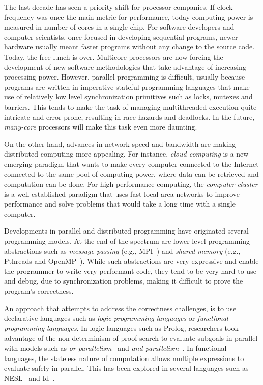 \documentclass[preprint]{sigplanconf}
\begin{document}
The last decade has seen a priority shift for processor companies. If clock frequency
was once the main metric for performance, today computing power is measured in number of
cores in a single chip.
For software developers and computer scientists, once focused in developing sequential programs,
newer hardware usually meant faster programs without any change to the source code. Today,
the free lunch is over. Multicore processors are now forcing the development of
new software methodologies that take advantage of increasing processing power.
However, parallel programming is difficult, usually because programs are written
in imperative stateful programming languages that make use of relatively low level synchronization
primitives such as locks, mutexes and barriers. This tends to make the task of managing multithreaded
execution quite intricate and error-prone, resulting in race hazards and deadlocks.
In the future, \emph{many-core} processors will make this task even more daunting.

On the other hand, advances in network speed and bandwidth are making distributed computing
more appealing. For instance, \emph{cloud computing} is a new emerging paradigm that wants
to make every computer connected to the Internet connected to the same pool of computing power,
where data can be retrieved and computation can be done. For high performance computing, the
\emph{computer cluster} is a well established paradigm that uses fast local area networks to
improve performance and solve problems that would take a long time with a single computer.

Developments in parallel and distributed programming have originated several programming models.
At the end of the spectrum are lower-level programming abstractions such as
\emph{message passing} (e.g., MPI~\cite{gabriel04-open-mpi}) and \emph{shared memory}
(e.g., Pthreads and OpenMP~\cite{Chapman-2007-UOP-1370966}).
While such abstractions are very expressive and enable the programmer to write very performant code,
they tend to be very hard to use and debug, due to synchronization problems, making it difficult to
prove the program's correctness.

An approach that attempts to address the correctness challenges, is to use declarative languages
such as \emph{logic programming languages} or \emph{functional programming languages}. In logic languages such
as Prolog, researchers took advantage of the non-determinism of proof-search to evaluate subgoals
in parallel with models such as \emph{or-parallelism}~\cite{ali-86} and \emph{and-parallelism}~\cite{Shen-92}. In functional languages, the stateless nature of computation
allows multiple expressions to evaluate safely in parallel. This has been explored in several languages
such as NESL~\cite{Blelloch:1996:PPA:227234.227246} and Id~\cite{Nikhil93anoverview}.
\end{document}
